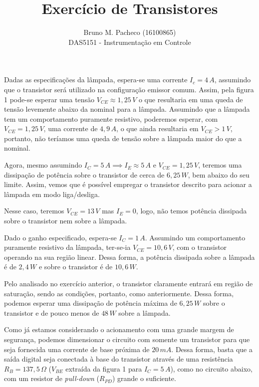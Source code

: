 \documentclass[a4paper]{report}
\begin{document}
 
\title{Exercício de Transistores}
\author{Bruno M. Pacheco (16100865)\\
DAS5151 - Instrumentação em Controle}
 
\maketitle
 

Dadas as especificações da lâmpada, espera-se uma corrente $I_c = 4\,A$, assumindo que o transistor será utilizado na configuração emissor comum. Assim, pela figura 1 pode-se esperar uma tensão $V_{CE} \approx 1,25\,V$ o que resultaria em uma queda de tensão levemente abaixo da nominal para a lâmpada. Assumindo que a lâmpada tem um comportamento puramente resistivo, poderemos esperar, com $V_{CE} = 1,25\,V$, uma corrente de $4,9\,A$, o que ainda resultaria em $V_{CE} > 1\,V$, portanto, não teríamos uma queda de tensão sobre a lâmpada maior do que a nominal.

Agora, mesmo assumindo $I_C = 5\,A \implies I_E \approx 5\,A$ e $V_{CE}= 1,25\,V$, teremos uma dissipação de potência sobre o transistor de cerca de $6,25\,W$, bem abaixo do seu limite. Assim, vemos que é possível empregar o transistor descrito para acionar a lâmpada em modo liga/desliga.



Nesse caso, teremos $V_{CE} = 13\,V$ mas $I_E = 0$, logo, não temos potência dissipada sobre o transistor nem sobre a lâmpada.


Dado o ganho especificado, espera-se $I_C = 1\,A$. Assumindo um comportamento puramente resistivo da lâmpada, ter-se-ia $V_{CE} = 10,6\,V$, com o transistor operando na sua região linear. Dessa forma, a potência dissipada sobre a lâmpada é de $2,4\,W$ e sobre o transistor é de $10,6\,W$.


Pelo analisado no exercício anterior, o transistor claramente entrará em região de saturação, sendo as condições, portanto, como anteriormente. Dessa forma, podemos esperar uma dissipação de potência máxima de $6,25\,W$ sobre o transistor e de pouco menos de $48\,W$ sobre a lâmpada.


Como já estamos considerando o acionamento com uma grande margem de segurança, podemos dimensionar o circuito com somente um transistor para que seja fornecida uma corrente de base próxima de $20\,mA$. Dessa forma, basta que a saída digital seja conectada à base do transistor através de uma resistência $R_B = 137,5\,\Omega$ ($V_{BE}$ extraída da figura 1 para $I_C=5\,A$), como no circuito abaixo, com um resistor de \emph{pull-down} ($R_{PD}$) grande o suficiente.
\end{document}
